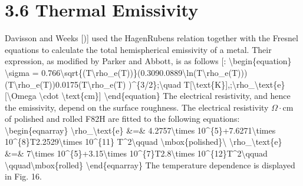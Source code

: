 \documentclass[letterpaper,10pt,english]{jupyterBook}
\begin{document}
	
	\section{3.6 Thermal Emissivity}
	\label{\detokenize{3 Thermophysical Properties:thermal-emissivity}}
	\sphinxAtStartPar
	Davisson and Weeks {[}){]} used the Hagen\sphinxhyphen{}Rubens relation together with the Fresnel equations to calculate the total hemispherical emissivity of a metal. Their expression, as modified by Parker and Abbott, is as follows {[}\sphinxhref{https://drive.google.com/file/d/1UDK7JKiKA2aBe0XYm5HMXWTIijG35Sp-/view?usp=drive\_link}{Sievers1978}{]}:
	\textbackslash{}begin\{equation\}
	\textbackslash{}sigma = 0.766\textbackslash{}sqrt\{(T\textbackslash{}rho\_e(T))\}\sphinxhyphen{}(0.309\sphinxhyphen{}0.0889\textbackslash{}ln(T\textbackslash{}rho\_e(T)))(T\textbackslash{}rho\_e(T))\sphinxhyphen{}0.0175(T\textbackslash{}rho\_e(T) )\textasciicircum{}\{3/2\};\textbackslash{}quad T{[}\textbackslash{}text\{K\}{]},;\textbackslash{}rho\_\textbackslash{}text\{e\} {[}\textbackslash{}Omega \textbackslash{}cdot \textbackslash{}text\{cm\}{]}
	\textbackslash{}end\{equation\}
	The electrical resistivity, and hence the emissivity, depend on the surface roughness. The electrical resistivity \(\Omega \cdot\)cm of polished and rolled F82H are fitted to the following equations:
	\textbackslash{}begin\{eqnarray\}
	\textbackslash{}rho\_\textbackslash{}text\{e\} \&=\& 4.2757\textbackslash{}times 10\textasciicircum{}\{\sphinxhyphen{}5\}+7.6271\textbackslash{}times 10\textasciicircum{}\{\sphinxhyphen{}8\}T\sphinxhyphen{}2.2529\textbackslash{}times 10\textasciicircum{}\{\sphinxhyphen{}11\} T\textasciicircum{}2\textbackslash{}qquad \textbackslash{}mbox\{polished\}\textbackslash{}
	\textbackslash{}rho\_\textbackslash{}text\{e\} \&=\& 7\textbackslash{}times 10\textasciicircum{}\{\sphinxhyphen{}5\}+3.15\textbackslash{}times 10\textasciicircum{}\{\sphinxhyphen{}7\}T\sphinxhyphen{}2.8\textbackslash{}times 10\textasciicircum{}\{\sphinxhyphen{}12\}T\textasciicircum{}2\textbackslash{}qquad \textbackslash{}qquad\textbackslash{}mbox\{rolled\}
	\textbackslash{}end\{eqnarray\}
	The temperature dependence is displayed in Fig. 16.
	
\end{document}
